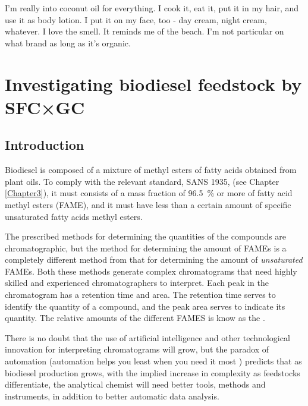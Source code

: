 
\begin{savequote}[45mm] I'm really into coconut oil for everything. I cook it,
eat it, put it in my hair, and use it as body lotion. I put it on my face, too -
day cream, night cream, whatever. I love the smell. It reminds me of the beach.
I'm not particular on what brand as long as it's organic.

\end{savequote}

\chapter{Investigating biodiesel feedstock by SFC×GC} %

\label{Chapter6} %


\section{Introduction}

Biodiesel is composed of a mixture of methyl esters of fatty acids obtained from
plant oils. To comply with the relevant standard, SANS 1935, \autocite{SANS1935}
(see Chapter \ref{Chapter3}), it must consists of a mass fraction of
\SI{96.5}{\percent} or more of fatty acid methyl esters (FAME), and it must have
less than a certain amount of specific unsaturated fatty acids methyl esters.

The prescribed methods for determining the quantities of the compounds are
chromatographic, but the method for  determining the amount of FAMEs is a
completely different method from that for determining the amount of
\textit{unsaturated} FAMEs. Both these methods generate complex chromatograms
that need highly skilled and experienced chromatographers to interpret. Each
peak in the chromatogram has a retention time and area. The retention time
serves to identify the quantity of a compound, and the peak area serves to
indicate its quantity. The relative amounts of the different FAMES is know as
the .

There is no doubt that the use of artificial intelligence and other
technological innovation for interpreting chromatograms will grow, but the
paradox of automation (automation helps you least when you need it most
\autocite{Strauch2018, Bainbridge1983}) predicts that as biodiesel production
grows, with the implied increase in complexity as feedstocks differentiate, the
analytical chemist will need better tools, methods and instruments, in addition
to better automatic data analysis.

